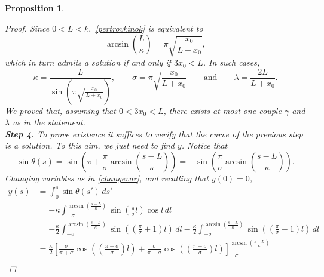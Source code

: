 \documentclass[11pt]{amsart}
\renewcommand{\k}{\kappa}
\newtheorem{proposition}[theorem]{Proposition}
\theoremstyle{definition}
\theoremstyle{remark}
\numberwithin{equation}{section}
\begin{document}
\begin{proposition}
\begin{proof}
	Since $0<L<k,$  \eqref{pertrovkinok} is equivalent to
	\begin{equation*}
		\arcsin\left(\frac{L}{\k}\right)=\pi\sqrt{\frac{x_0}{ L+x_0 }},
	\end{equation*}
	which in turn admits a solution if and only if $3x_0<L$. 
	In such cases, 
	\begin{equation*}
		\k=\frac{L}{ \sin\left(\pi\sqrt{\frac{x_0}{L+x_0}}\right)},\qquad \sigma=\pi\sqrt{\frac{x_0}{L+x_0}}\qquad\text{and}\qquad    \lambda=\frac{2L}{L+x_0}.
	\end{equation*}
	We proved that, assuming that $0<3x_0<L$, there exists at most one couple $\gamma$ and $\lambda$ as in the statement.\\
	\textbf{Step 4.} To prove existence it suffices to verify that the curve of the previous step is a solution. To this aim, we just need to find $y$. Notice that 
	\begin{equation*}
		\sin\theta(s)=\sin\left(\pi+\frac{\pi}{\sigma}\arcsin\left(\frac{s-L}{\k}\right)\right)=-\sin\left(\frac{\pi}{\sigma}\arcsin\left(\frac{s-L}{\k}\right)\right).
	\end{equation*}
	Changing variables as in \eqref{changevar}, and recalling that $y(0)=0$,
	\begin{equation*}
		\begin{split}
			y(s)&=\int_0^s\sin\theta(s')\,ds'\\
			&=-\k\int^{\arcsin\left(\frac{s-L}{\k}\right)}_{-\sigma}\sin \left(\frac{\pi}{\sigma}l\right)\cos l\,dl\\
			&=-\frac{\k}{2}\int^{\arcsin\left(\frac{s-L}{\k}\right)}_{-\sigma}\sin\left(\left(\frac{\pi}{\sigma}+1\right)l\right)\,d l-\frac{\k}{2}\int^{\arcsin\left(\frac{s-L}{\k}\right)}_{-\sigma}\sin\left(\left(\frac{\pi}{\sigma}-1\right)l\right)\,d l\\
			&=\frac{\k}{2}\left[\frac{\sigma}{\pi+\sigma}\cos\left(\left(\frac{\pi+\sigma}{\sigma}\right)l\right)+\frac{\sigma}{\pi-\sigma}\cos\left(\left(\frac{\pi-\sigma}{\sigma}\right)l\right)\right]_{-\sigma}^{\arcsin\left(\frac{s-L}{\k}\right)}\\

\end{split}
\end{equation*}
\end{proof}
\end{proposition}
\end{document}

